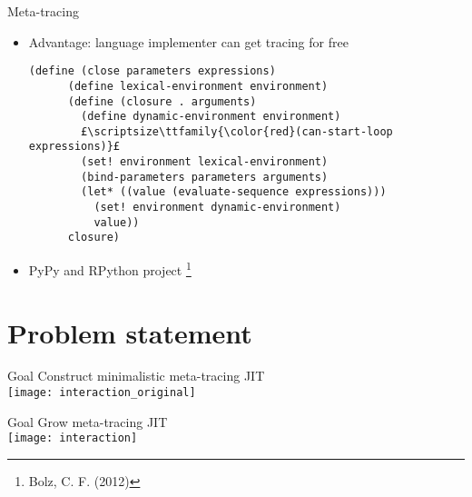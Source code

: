 \documentclass{beamer}
\begin{document}
\begin{frame}[fragile]{Meta-tracing}
\begin{itemize}

\item Advantage: language implementer can get tracing for free

\pause

\begin{lstlisting}[basicstyle = \scriptsize\ttfamily, escapechar = £]
	(define (close parameters expressions)
      (define lexical-environment environment)
      (define (closure . arguments)
        (define dynamic-environment environment)
        £\scriptsize\ttfamily{\color{red}(can-start-loop expressions)}£
        (set! environment lexical-environment)
        (bind-parameters parameters arguments)
        (let* ((value (evaluate-sequence expressions)))
          (set! environment dynamic-environment)
          value))
      closure)
\end{lstlisting}

\pause
\item PyPy and RPython project \footnote{\tiny{Bolz, C. F. (2012)}}

\end{itemize}
\end{frame}

\section{Problem statement}

\begin{frame}{Goal}
\centering
\vspace{1cm}
\Large Construct minimalistic meta-tracing JIT\\
\vspace{1cm}
\texttt{[image: interaction\_original]}
\end{frame}

\begin{frame}{Goal}
\centering
\vspace{1cm}
\Large Grow meta-tracing JIT\\
\vspace{1cm}
\texttt{[image: interaction]}
\end{frame}

\end{document}

